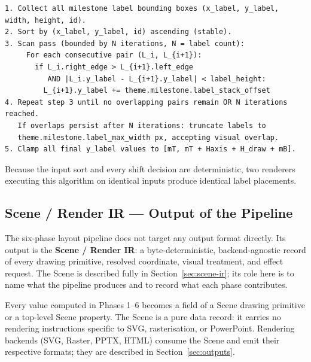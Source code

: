 \begin{lstlisting}[caption={Phase 6: Milestone label collision resolution}]
1. Collect all milestone label bounding boxes (x_label, y_label, width, height, id).
2. Sort by (x_label, y_label, id) ascending (stable).
3. Scan pass (bounded by N iterations, N = label count):
     For each consecutive pair (L_i, L_{i+1}):
       if L_i.right_edge > L_{i+1}.left_edge
          AND |L_i.y_label - L_{i+1}.y_label| < label_height:
         L_{i+1}.y_label += theme.milestone.label_stack_offset
4. Repeat step 3 until no overlapping pairs remain OR N iterations reached.
   If overlaps persist after N iterations: truncate labels to
   theme.milestone.label_max_width px, accepting visual overlap.
5. Clamp all final y_label values to [mT, mT + Haxis + H_draw + mB].
\end{lstlisting}

Because the input sort and every shift decision are deterministic, two renderers executing
this algorithm on identical inputs produce identical label placements.

\subsection{Scene / Render IR --- Output of the Pipeline}
\label{sec:scene-output}

The six-phase layout pipeline does not target any output format directly. Its output is the
\textbf{Scene / Render IR}: a byte-deterministic, backend-agnostic record of every drawing
primitive, resolved coordinate, visual treatment, and effect request. The Scene is described
fully in Section~\ref{sec:scene-ir}; its role here is to name what the pipeline produces
and to record what each phase contributes.

Every value computed in Phases 1--6 becomes a field of a Scene drawing primitive or a
top-level Scene property. The Scene is a pure data record: it carries no rendering
instructions specific to SVG, rasterisation, or PowerPoint. Rendering backends (SVG,
Raster, PPTX, HTML) consume the Scene and emit their respective formats; they are described
in Section~\ref{sec:outputs}.

